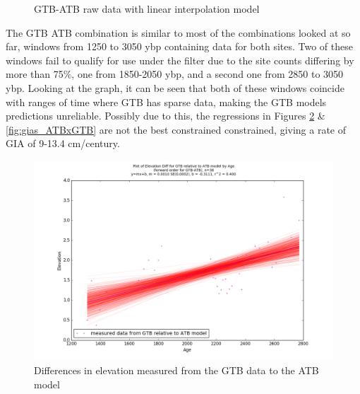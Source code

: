 \begin{figure}[h]
	\caption{GTB-ATB raw data with linear interpolation model}
	\label{fig:data_GTBxATB}
\end{figure}

The GTB ATB combination is similar to most of the combinations looked at so far,
windows from 1250 to 3050 ybp containing data for both sites. Two of these windows
fail to qualify for use under the filter due to the site counts differing by more
than 75\%, one from 1850-2050 ybp, and a second one from 2850 to 3050 ybp. Looking
at the graph, it can be seen that both of these windows coincide with ranges of
time where GTB has sparse data, making the GTB models predictions unreliable.
Possibly due to this, the
regressions in Figures \ref{fig:gias_GTBxATB} \& \ref{fig:gias_ATBxGTB} are not
the best constrained constrained, giving a rate of GIA of 9-13.4 cm/century.
\newpage

\begin{figure}[h]
	\includegraphics[width=0.9\linewidth]{data/bothNonZero/withinSeventyFivePercent/gias/theGIA_GTB_relative_to_ATB.png}
	\caption{Differences in elevation measured from the GTB data to the ATB model}
	\label{fig:gias_GTBxATB}
\end{figure}
\newpage


